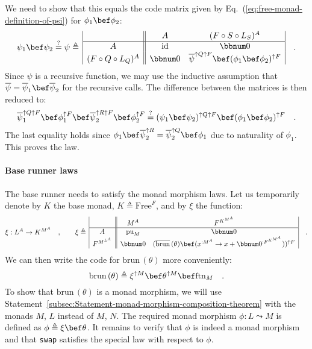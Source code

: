 We need to show that this equals the code matrix given by Eq.~(\ref{eq:free-monad-definition-of-psi})
for $\phi_{1}\bef\phi_{2}$:
\[
\psi_{1}\bef\psi_{2}\overset{?}{=}\psi\triangleq\,\begin{array}{|c||cc|}
 & A & (F\circ S\circ L_{S})^{A}\\
\hline A & \text{id} & \bbnum 0\\
(F\circ Q\circ L_{Q})^{A} & \bbnum 0 & \overline{\psi}^{\uparrow Q\uparrow F}\bef(\phi_{1}\bef\phi_{2})^{\uparrow F}
\end{array}\quad.
\]
Since $\psi$ is a recursive function, we may use the inductive assumption
that $\overline{\psi}=\overline{\psi}_{1}\bef\overline{\psi}_{2}$
for the recursive calls. The difference between the matrices is then
reduced to:
\[
\overline{\psi}_{1}^{\uparrow Q\uparrow F}\bef\phi_{1}^{\uparrow F}\bef\overline{\psi}_{2}^{\uparrow R\uparrow F}\bef\phi_{2}^{\uparrow F}\overset{?}{=}(\psi_{1}\bef\psi_{2})^{\uparrow Q\uparrow F}\bef(\phi_{1}\bef\phi_{2})^{\uparrow F}\quad.
\]
The last equality holds since $\phi_{1}\bef\overline{\psi}_{2}^{\uparrow R}=\overline{\psi}_{2}^{\uparrow Q}\bef\phi_{1}$
due to naturality of $\phi_{1}$. This proves the law.

\paragraph{Base runner laws}

The base runner needs to satisfy the monad morphism laws. Let us
temporarily denote by $K$ the base monad, $K\triangleq\text{Free}^{F}$,
and by $\xi$ the function:
\[
\xi:L^{A}\rightarrow K^{M^{A}}\quad,\quad\quad\xi\triangleq\,\begin{array}{|c||cc|}
 & M^{A} & F^{K^{M^{A}}}\\
\hline A & \text{pu}_{M} & \bbnum 0\\
F^{M^{L^{A}}} & \bbnum 0 & (\overline{\text{brun}}\,(\theta)\bef(x^{:M^{A}}\rightarrow x+\bbnum 0^{:F^{K^{M^{A}}}}))^{\uparrow F}
\end{array}\quad.
\]
We can then write the code for $\text{brun}\,(\theta)$ more conveniently:
\[
\text{brun}\,(\theta)\triangleq\xi^{\uparrow M}\bef\theta^{\uparrow M}\bef\text{ftn}_{M}\quad.
\]
To show that $\text{brun}\,(\theta)$ is a monad morphism, we will
use Statement~\ref{subsec:Statement-monad-morphism-composition-theorem}
with the monads $M$, $L$ instead of $M$, $N$. The required monad
morphism $\phi:L\leadsto M$ is defined as $\phi\triangleq\xi\bef\theta$.
It remains to verify that $\phi$ is indeed a monad morphism and that
\lstinline!swap! satisfies the special law with respect to $\phi$.


